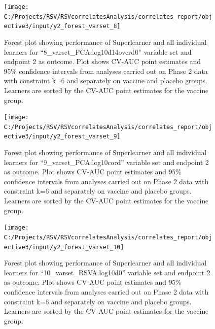 \documentclass[11pt]{article}
\begin{document}
\begin{figure}[H]

{\centering \texttt{[image: C:/Projects/RSV/RSVcorrelatesAnalysis/correlates\_report/objective3/input/y2\_forest\_varset\_8]} 

}

\caption[Forest plot for ``8\_varset\_PCA.log10d14overd0'' variable set, endpoint 2.]{Forest plot showing performance of Superlearner and all individual learners for ``8\_varset\_PCA.log10d14overd0'' variable set and endpoint 2 as outcome. Plot shows CV-AUC point estimates and 95\% confidence intervals from analyses carried out on Phase 2 data with constraint k=6 and separately on vaccine and placebo groups. Learners are sorted by the CV-AUC point estimates for the vaccine group.}\label{fig:y2-forest-varset-8}
\end{figure}

\begin{figure}[H]

{\centering \texttt{[image: C:/Projects/RSV/RSVcorrelatesAnalysis/correlates\_report/objective3/input/y2\_forest\_varset\_9]} 

}

\caption[Forest plot for ``9\_varset\_PCA.log10cord'' variable set, endpoint 2.]{Forest plot showing performance of Superlearner and all individual learners for ``9\_varset\_PCA.log10cord'' variable set and endpoint 2 as outcome. Plot shows CV-AUC point estimates and 95\% confidence intervals from analyses carried out on Phase 2 data with constraint k=6 and separately on vaccine and placebo groups. Learners are sorted by the CV-AUC point estimates for the vaccine group.}\label{fig:y2-forest-varset-9}
\end{figure}

\begin{figure}[H]

{\centering \texttt{[image: C:/Projects/RSV/RSVcorrelatesAnalysis/correlates\_report/objective3/input/y2\_forest\_varset\_10]} 

}

\caption[Forest plot for ``10\_varset\_RSVA.log10d0'' variable set, endpoint 2.]{Forest plot showing performance of Superlearner and all individual learners for ``10\_varset\_RSVA.log10d0'' variable set and endpoint 2 as outcome. Plot shows CV-AUC point estimates and 95\% confidence intervals from analyses carried out on Phase 2 data with constraint k=6 and separately on vaccine and placebo groups. Learners are sorted by the CV-AUC point estimates for the vaccine group.}\label{fig:y2-forest-varset-10}
\end{figure}
\end{document}
